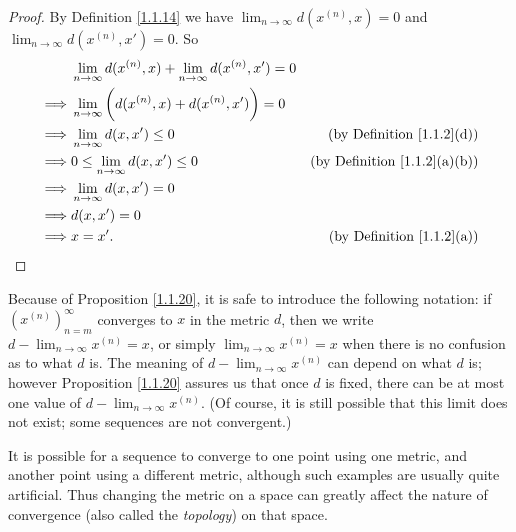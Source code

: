 \begin{proof}
    By Definition \ref{1.1.14} we have \(\lim_{n \to \infty} d(x^{(n)}, x) = 0\) and \(\lim_{n \to \infty} d(x^{(n)}, x') = 0\).
    So
    \begin{align*}
                 & \lim_{n \to \infty} d(x^{(n)}, x) + \lim_{n \to \infty} d(x^{(n)}, x') = 0                                            \\
        \implies & \lim_{n \to \infty} \bigg(d(x^{(n)}, x) + d(x^{(n)}, x')\bigg) = 0                                                    \\
        \implies & \lim_{n \to \infty} d(x, x') \leq 0                                        & \text{(by Definition \ref{1.1.2}(d))}    \\
        \implies & 0 \leq \lim_{n \to \infty} d(x, x') \leq 0                                 & \text{(by Definition \ref{1.1.2}(a)(b))} \\
        \implies & \lim_{n \to \infty} d(x, x') = 0                                                                                      \\
        \implies & d(x, x') = 0                                                                                                          \\
        \implies & x = x'.                                                                    & \text{(by Definition \ref{1.1.2}(a))}
    \end{align*}
\end{proof}

\begin{note}
    Because of Proposition \ref{1.1.20}, it is safe to introduce the following notation:
    if \((x^{(n)})_{n = m}^\infty\) converges to \(x\) in the metric \(d\), then we write \(d - \lim_{n \to \infty} x^{(n)} = x\), or simply \(\lim_{n \to \infty} x^{(n)} = x\) when there is no confusion as to what \(d\) is.
    The meaning of \(d - \lim_{n \to \infty} x^{(n)}\) can depend on what \(d\) is;
    however Proposition \ref{1.1.20} assures us that once \(d\) is fixed, there can be at most one value of \(d - \lim_{n \to \infty} x^{(n)}\).
    (Of course, it is still possible that this limit does not exist;
    some sequences are not convergent.)
\end{note}

\begin{remark}\label{1.1.21}
    It is possible for a sequence to converge to one point using one metric, and another point using a different metric, although such examples are usually quite artificial.
    Thus changing the metric on a space can greatly affect the nature of convergence (also called the \emph{topology}) on that space.
\end{remark}

